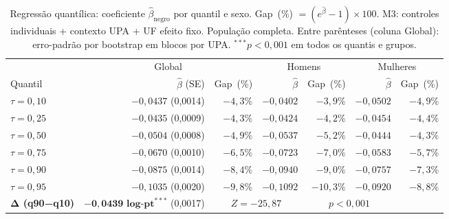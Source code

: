 \begin{table}[H]
\centering
\caption{Regressão quantílica: coeficiente $\hat{\beta}_{\text{negro}}$ por quantil e sexo.
         Gap~(\%) $= (e^{\hat{\beta}}-1)\times 100$.
         M3: controles individuais + contexto UPA + UF efeito fixo. População completa.
         Entre parênteses (coluna Global): erro-padrão por bootstrap em blocos por UPA.
         $^{***}p<0{,}001$ em todos os quantis e grupos.}
\label{tab:qr_melhorias}
\small
\begin{tabular}{lrrrrrr}
\toprule
& \multicolumn{2}{c}{Global} & \multicolumn{2}{c}{Homens} & \multicolumn{2}{c}{Mulheres} \\
\cmidrule(lr){2-3}\cmidrule(lr){4-5}\cmidrule(lr){6-7}
Quantil & $\hat{\beta}$ (SE) & Gap~(\%) & $\hat{\beta}$ & Gap~(\%) & $\hat{\beta}$ & Gap~(\%) \\
\midrule
$\tau=0{,}10$ & $-0{,}0437$ (0{,}0014) & $-4{,}3\%$ & $-0{,}0402$ & $-3{,}9\%$ & $-0{,}0502$ & $-4{,}9\%$ \\
$\tau=0{,}25$ & $-0{,}0435$ (0{,}0009) & $-4{,}3\%$ & $-0{,}0424$ & $-4{,}2\%$ & $-0{,}0454$ & $-4{,}4\%$ \\
$\tau=0{,}50$ & $-0{,}0504$ (0{,}0008) & $-4{,}9\%$ & $-0{,}0537$ & $-5{,}2\%$ & $-0{,}0444$ & $-4{,}3\%$ \\
$\tau=0{,}75$ & $-0{,}0670$ (0{,}0010) & $-6{,}5\%$ & $-0{,}0723$ & $-7{,}0\%$ & $-0{,}0583$ & $-5{,}7\%$ \\
$\tau=0{,}90$ & $-0{,}0875$ (0{,}0014) & $-8{,}4\%$ & $-0{,}0940$ & $-9{,}0\%$ & $-0{,}0757$ & $-7{,}3\%$ \\
$\tau=0{,}95$ & $-0{,}1035$ (0{,}0020) & $-9{,}8\%$ & $-0{,}1092$ & $-10{,}3\%$ & $-0{,}0920$ & $-8{,}8\%$ \\
\midrule
\textbf{Δ (q90−q10)} & $\mathbf{-0{,}0439\text{ log-pt}}^{***}$ (0{,}0017) & \multicolumn{2}{c}{$Z = -25{,}87$} & \multicolumn{2}{c}{$p < 0{,}001$} \\
\bottomrule
\end{tabular}
\end{table}
